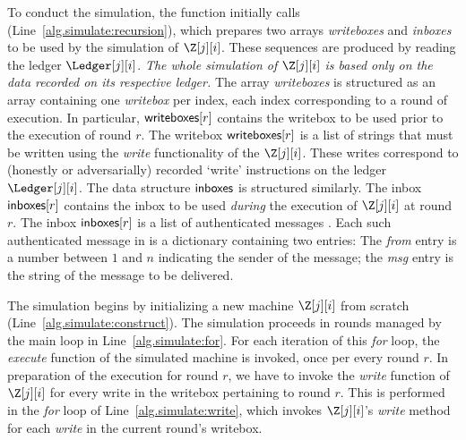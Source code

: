 To conduct the simulation, the \simulate function initially calls
\prepareSimulationInputs (Line~\ref{alg.simulate:recursion}),
which prepares two arrays \emph{writeboxes}
and \emph{inboxes} to be used by the simulation of $\Z[j][i]$.
These sequences are produced by reading the ledger $\Ledger[j][i]$.
\emph{The whole simulation of $\Z[j][i]$ is based only on the data
recorded on its respective ledger.}
The array \emph{writeboxes} is structured as an array containing
one \emph{writebox} per index, each index corresponding to a
round of execution. In particular, $\textsf{writeboxes}[r]$ contains the
writebox to be used prior to the execution of round $r$.
The writebox $\textsf{writeboxes}[r]$ is a list of strings that must be
written using the \emph{write} functionality of the $\Z[j][i]$.
These writes correspond to (honestly or adversarially) recorded
`write' instructions on the ledger $\Ledger[j][i]$.
The data structure $\textsf{inboxes}$ is structured similarly.
The inbox $\textsf{inboxes}[r]$ contains the inbox to be used \emph{during}
the execution of $\Z[j][i]$ at round $r$. The inbox $\textsf{inboxes}[r]$
is a list of authenticated messages \netins. Each such authenticated
message \netin in \netins is a dictionary containing two entries:
The \emph{from} entry is a number between $1$ and $n$ indicating the
sender of the message; the \emph{msg} entry is the string of
the message to be delivered.

The simulation begins by initializing a new machine $\Z[j][i]$
from scratch (Line~\ref{alg.simulate:construct}). The simulation
proceeds in rounds managed by the main loop in
Line~\ref{alg.simulate:for}. For each iteration of this \emph{for}
loop, the \emph{execute} function of the simulated machine
is invoked, once per every round $r$. In preparation of the
execution for round $r$, we have to invoke the \emph{write}
function of $\Z[j][i]$ for every write in the writebox pertaining
to round $r$. This is performed in the \emph{for} loop of
Line~\ref{alg.simulate:write}, which invokes $\Z[j][i]$'s
\emph{write} method for each \emph{write} in the current
round's writebox.

